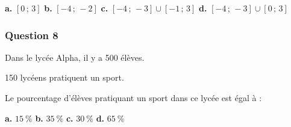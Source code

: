\textbf{a.} $[0\,;\,3]$ \hfill \textbf{b.} $[-4\,;\,-2]$ \hfill \textbf{c.} $[-4\,;\,-3]\cup[-1\,;\,3]$ \hfill \textbf{d.} $[-4\,;\,-3]\cup[0\,;\,3]$

\subsubsection*{Question 8}
Dans le lycée Alpha, il y a 500 élèves.

150 lycéens pratiquent un sport.

Le pourcentage d'élèves pratiquant un sport dans ce lycée est égal à :

\textbf{a.} $15\ \%$ \hfill \textbf{b.} $35\ \%$ \hfill \textbf{c.} $30\ \%$ \hfill \textbf{d.} $65\ \%$




\begin{center}
\end{center}
